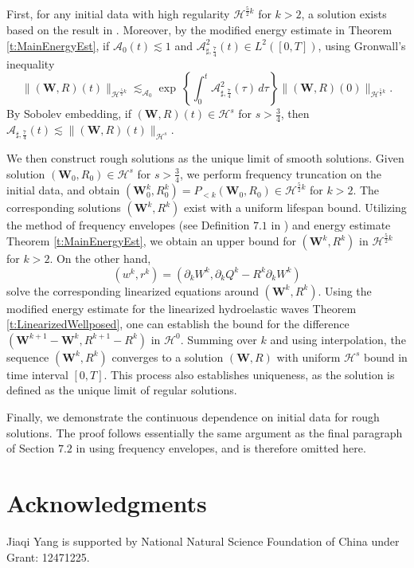 \documentclass[10pt]{amsart}
\theoremstyle{remark}
\theoremstyle{definition}
\numberwithin{equation}{section}
\renewcommand{\H}{{\mathcal H }}
\newcommand{\f}{\frac}
\newcommand{\bw}{\mathbf{W}}
\newcommand{\CalAZ}{{\mathcal{A}_0}}
\newcommand{\ASSharp}{{\mathcal{A}_{\sharp,\frac{7}{4}}^2}}
\begin{document}
First, for any initial data with high regularity $\mathcal{H}^{\f52k}$ for $k>2$, a solution exists based on the result in \cite{MR4104949}.
Moreover, by the modified energy estimate in Theorem \ref{t:MainEnergyEst}, if $\mathcal{A}_0(t) \lesssim 1$ and $\ASSharp(t) \in L^2([0,T])$, using Gronwall's inequality
\begin{equation*}
   \|(\bw, R)(t)\|_{\mathcal{H}^{\f52k}}  \lesssim_\CalAZ \exp{ \ \left\{\int_0^t \ASSharp(\tau) \,d\tau \right\}  }  \|(\bw, R)(0)\|_{\mathcal{H}^{\f52k}}.
\end{equation*}
By Sobolev embedding, if $(\bw, R)(t) \in \H^s$ for $s>\f34$, then $\mathcal{A}_{\sharp, \f74}(t) \lesssim \|(\bw, R)(t) \|_{\H^s}$.

We then construct rough solutions as the unique limit of smooth solutions.
Given solution $(\bw_0, R_0) \in \H^s$ for $s>\f34$, we perform frequency truncation on the initial data, and obtain $(\bw_0^k, R_0^k) = P_{<k}(\bw_0, R_0) \in \mathcal{H}^{\f52k}$ for $k>2$. 
The corresponding solutions $(\bw^k, R^k)$ exist with a uniform lifespan bound.
Utilizing the method of frequency envelopes (see Definition $7.1 $ in \cite{AIT}) and energy estimate Theorem \ref{t:MainEnergyEst}, we obtain an upper bound for $(\bw^k, R^k)$ in $\H^{\f{5}{2}k}$ for $k>2$. 
On the other hand, 
\begin{equation*}
    (w^k, r^k) = (\partial_k W^{k}, \partial_k Q^{k} - R^{k} \partial_k W^{k} )
\end{equation*}
solve the corresponding linearized equations around $(\bw^{k}, R^{k})$.
Using the modified energy estimate for the linearized hydroelastic waves Theorem \ref{t:LinearizedWellposed},  
one can establish the bound for the difference $(\bw^{k+1}-\bw^{k}, R^{k+1}-R^{k})$ in $\mathcal{H}^{0}$.
Summing over $k$ and using interpolation, the sequence $(\bw^{k}, R^{k})$ converges to a solution $(\bw, R)$ with uniform $\mathcal{H}^{s}$ bound in time interval $[0,T]$.
This process also establishes uniqueness, as the solution is defined as the unique limit of regular solutions.

Finally, we demonstrate the continuous dependence on initial data for rough solutions.
The proof follows essentially the same argument as the final paragraph of Section $7.2$ in \cite{AIT} using frequency envelopes, and is therefore omitted here.

\section*{Acknowledgments}
Jiaqi Yang is supported by National Natural Science Foundation of China under Grant: 12471225.
\end{document}
